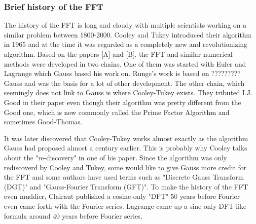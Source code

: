 \subsubsection{Brief history of the FFT} 
The history of the FFT is long and cloudy with multiple scientists working on a similar problem between 1800-2000. Cooley and Tukey introduced their algorithm in 1965 and at the time it was regarded as a completely new and revolutionizing algorithm. Based on the papers [A] and [B], the FFT and similar numerical methods were developed in two chains. One of them was started with Euler and Lagrange which Gauss based his work on. Runge's work is based on ????????? Gauss and was the basis for a lot of other development. The other chain, which seemingly does not link to Gauss is where Cooley-Tukey exists. They tributed I.J. Good in their paper even though their algorithm was pretty different from the Good one, which is now commonly called the Prime Factor Algorithm and sometimes Good-Thomas. 


It was later discovered that Cooley-Tukey works almost exactly as the algorithm Gauss had proposed almost a century earlier. This is probably why Cooley talks about the "re-discovery" in one of his paper. Since the algorithm was only rediscoverd by Cooley and Tukey, some would like to give Gauss more credit for the FFT and some authors have used terms such as "Discrete Gauss Transform (DGT)" and "Gauss-Fourier Transform (GFT)". To make the history of the FFT even muddier, Clairaut published a cosine-only "DFT" 50 years before Fourier even came forth with the Fourier series. Lagrange came up a sine-only DFT-like formula around 40 years before Fourier series.




